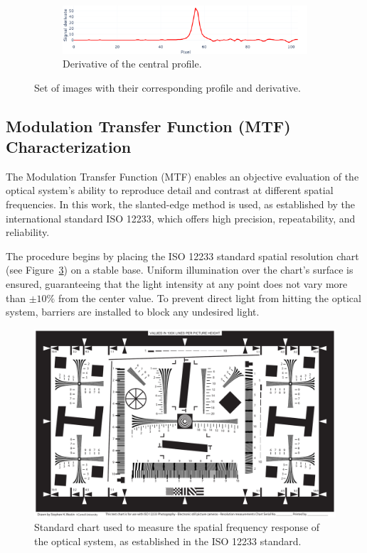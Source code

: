\begin{figure}[H]
    \begin{subfigure}[b]{0.95\linewidth}
        \centering
        \includegraphics[width=\linewidth]{Figures/C3/SE_diff.png}
        \caption{Derivative of the central profile.}
        \label{fig:se_diff}
    \end{subfigure}
    
    \caption{Set of images with their corresponding profile and derivative.}
    \label{fig:enfoque_conjunta}
\end{figure}

\subsection{Modulation Transfer Function (MTF) Characterization}

The Modulation Transfer Function (MTF) enables an objective evaluation of the optical system’s ability to reproduce detail and contrast at different spatial frequencies. In this work, the slanted-edge method is used, as established by the international standard ISO 12233, which offers high precision, repeatability, and reliability.

The procedure begins by placing the ISO 12233 standard spatial resolution chart (see Figure~\ref{fig:iso12233_test_chart}) on a stable base. Uniform illumination over the chart’s surface is ensured, guaranteeing that the light intensity at any point does not vary more than $\pm 10\%$ from the center value. To prevent direct light from hitting the optical system, barriers are installed to block any undesired light.

\begin{figure}[H]
    \centering
    \includegraphics[width=0.95\linewidth]{Figures/C3/ISO_12233-reschart.pdf}
    \caption{Standard chart used to measure the spatial frequency response of the optical system, as established in the ISO 12233 standard.}
    \label{fig:iso12233_test_chart}
\end{figure}

